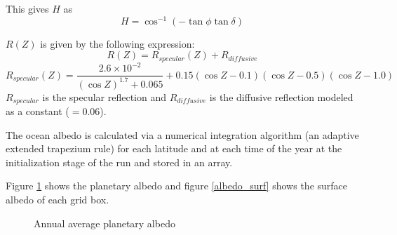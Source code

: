 \documentclass[10pt,a4paper]{report}
\begin{document}
This gives $H$ as
\begin{equation}
H = \cos^{-1}(- \tan \phi \tan \delta)
\end{equation}

$R(Z)$ is given by the following expression:
\begin{displaymath}
R(Z)=R_{specular}(Z)+R_{diffusive}
\end{displaymath}
\begin{equation}
R_{specular}(Z)=\frac{2.6\times 10^{-2}}{(\cos
Z)^{1.7}+0.065}+0.15(\cos Z -0.1)(\cos Z-0.5)(\cos Z-1.0)
\end{equation}
$R_{specular}$ is the specular reflection and $R_{diffusive}$ is the
diffusive reflection modeled as a constant ($=0.06$).

The ocean albedo is calculated via a numerical integration
algorithm (an adaptive extended trapezium rule) for each latitude
and at each time of the year at the initialization stage of the
run and stored in an array.

Figure \ref{albedo} shows the planetary albedo and figure
\ref{albedo_surf} shows the surface albedo of each grid box.

\begin{figure}
\centerline{}
\caption{Annual average planetary albedo}\label{albedo}
\end{figure}
\end{document}
